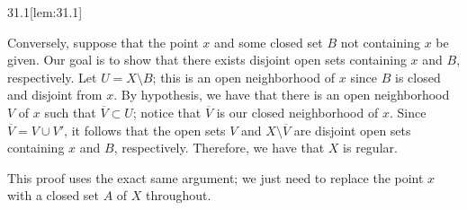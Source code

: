 \begin{thmBox}[Lemma]{31.1}[lem:31.1]
\begin{proofBox}
        \baseSkip

        Conversely, suppose that the point \( x \) and some closed set \( B \)
        not containing \( x \) be given.
        Our goal is to show that there exists disjoint open sets containing 
        \( x \) and \( B \), respectively.
        Let \( U = X \setminus B \); this is an open neighborhood of \( x \) 
        since \( B \) is closed and disjoint from \( x \).
        By hypothesis, we have that there is an open neighborhood \( V \) of 
        \( x \) such that \( \overline{ V } \subset U \); notice that 
        \( \overline{ V } \) is our closed neighborhood of \( x \).
        Since \( \overline{ V } = V \cup V' \), it follows that the open sets
        \( V \) and \( X \setminus \overline{ V } \) are disjoint open sets
        containing \( x \) and \( B \), respectively.
        Therefore, we have that \( X \) is regular.

        \baseSkip

        This proof uses the exact same argument; we just need to replace the 
        point \( x \) with a closed set \( A \) of \( X \) throughout.
    \end{proofBox}
\end{thmBox}

